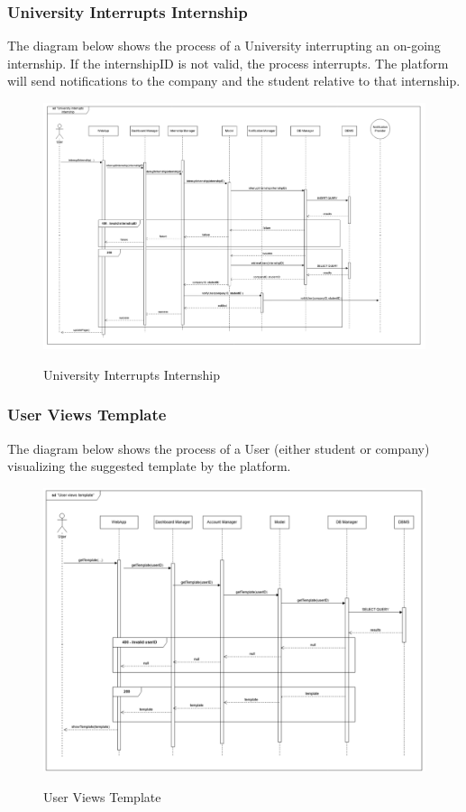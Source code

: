 \documentclass[a4paper,12pt]{article}
\begin{document}
\subsubsection*{University Interrupts Internship}
The diagram below shows the process of a University interrupting an on-going internship. If the internshipID is not valid, the process interrupts. The platform will send notifications to the company and the student relative to that internship.
\begin{figure}[H]
\centering
\includegraphics[scale = 0.4]{DD_figures/RuntimeView/UniversityInterruptsInternshipRV.png}\\
\caption{University Interrupts Internship}
\end{figure}
\newpage

\subsubsection*{User Views Template}
The diagram below shows the process of a User (either student or company) visualizing the suggested template by the platform.
\begin{figure}[H]
\centering
\includegraphics[scale = 0.5]{DD_figures/RuntimeView/UserViewsTemplateRV.png}\\
\caption{User Views Template}
\end{figure}
\newpage
\end{document}
